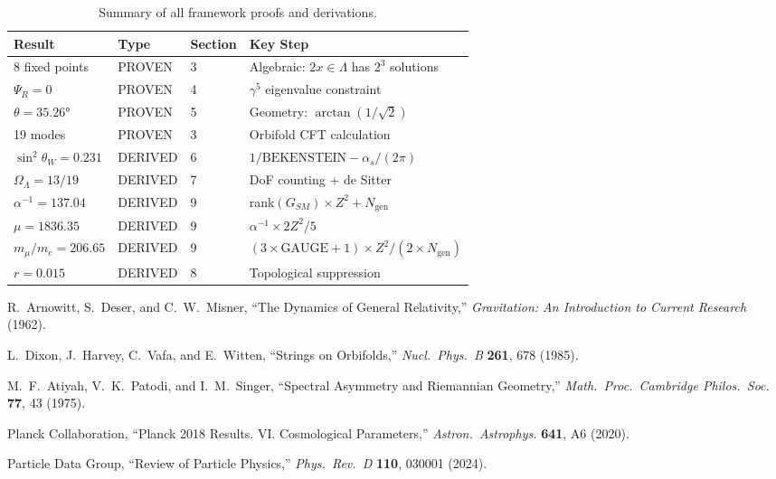 \documentclass[12pt,a4paper]{article}
\newcommand{\OmegaL}{\Omega_\Lambda}
\newcommand{\sinW}{\sin^2\theta_W}
\newcommand{\Zsq}{Z^2}
\newcommand{\GAUGE}{\text{GAUGE}}
\newcommand{\BEKENSTEIN}{\text{BEKENSTEIN}}
\newcommand{\Ngen}{N_{\text{gen}}}
\begin{document}
\begin{table}[H]
\centering
\begin{tabular}{llll}
\toprule
\textbf{Result} & \textbf{Type} & \textbf{Section} & \textbf{Key Step} \\
\midrule
8 fixed points & PROVEN & 3 & Algebraic: $2x \in \Lambda$ has $2^3$ solutions \\
$\Psi_R = 0$ & PROVEN & 4 & $\gamma^5$ eigenvalue constraint \\
$\theta = 35.26°$ & PROVEN & 5 & Geometry: $\arctan(1/\sqrt{2})$ \\
19 modes & PROVEN & 3 & Orbifold CFT calculation \\
$\sinW = 0.231$ & DERIVED & 6 & $1/\BEKENSTEIN - \alpha_s/(2\pi)$ \\
$\OmegaL = 13/19$ & DERIVED & 7 & DoF counting + de Sitter \\
$\alpha^{-1} = 137.04$ & DERIVED & 9 & rank$(G_{SM}) \times \Zsq + \Ngen$ \\
$\mu = 1836.35$ & DERIVED & 9 & $\alpha^{-1} \times 2\Zsq/5$ \\
$m_\mu/m_e = 206.65$ & DERIVED & 9 & $(3 \times \GAUGE + 1) \times \Zsq / (2 \times \Ngen)$ \\
$r = 0.015$ & DERIVED & 8 & Topological suppression \\
\bottomrule
\end{tabular}
\caption{Summary of all framework proofs and derivations.}
\end{table}

\begin{thebibliography}{99}

 R.~Arnowitt, S.~Deser, and C.~W.~Misner,
``The Dynamics of General Relativity,''
\textit{Gravitation: An Introduction to Current Research} (1962).

 L.~Dixon, J.~Harvey, C.~Vafa, and E.~Witten,
``Strings on Orbifolds,''
\textit{Nucl.\ Phys.\ B} \textbf{261}, 678 (1985).

 M.~F.~Atiyah, V.~K.~Patodi, and I.~M.~Singer,
``Spectral Asymmetry and Riemannian Geometry,''
\textit{Math.\ Proc.\ Cambridge Philos.\ Soc.} \textbf{77}, 43 (1975).

 Planck Collaboration,
``Planck 2018 Results. VI. Cosmological Parameters,''
\textit{Astron.\ Astrophys.} \textbf{641}, A6 (2020).

 Particle Data Group,
``Review of Particle Physics,''
\textit{Phys.\ Rev.\ D} \textbf{110}, 030001 (2024).

\end{thebibliography}
\end{document}
